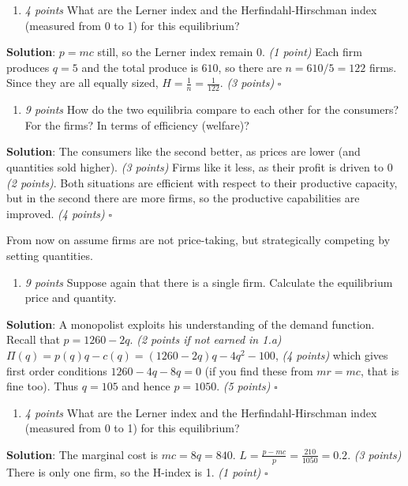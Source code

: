 \documentclass{article}
\begin{document}
\begin{enumerate}[resume*]
\item \textit{4 points }What are the Lerner index and the Herfindahl-Hirschman index (measured from 0 to 1) for this equilibrium?\end{enumerate}
\textbf{Solution}:
$p=mc$ still, so the Lerner index remain 0. \textit{(1 point)} Each firm produces $q=5$ and the total produce is $610$, so there are $n=610/5=122$ firms. Since they are all equally sized, $H=\frac 1n=\frac 1{122}$. \textit{(3 points)} $\square$

\begin{enumerate}[resume*]
  \item \textit{9 points }How do the two equilibria compare to each other for the consumers? For the firms? In terms of efficiency (welfare)?\end{enumerate}
\textbf{Solution}:
The consumers like the second better, as prices are lower (and quantities sold higher). \textit{(3 points)} Firms like it less, as their profit is driven to 0 \textit{(2 points)}. Both situations are efficient with respect to their productive capacity, but in the second there are more firms, so the productive capabilities are improved. \textit{(4 points)} $\square$


From now on assume firms are not price-taking, but strategically competing by setting quantities.

\begin{enumerate}[resume*]
\item \textit{9 points }Suppose again that there is a single firm. Calculate the equilibrium price and quantity.\end{enumerate}
\textbf{Solution}:
A monopolist exploits his understanding of the demand function. Recall that $p=1260-2q$. \textit{(2 points if not earned in 1.a)}
$\Pi(q)=p(q)q-c(q)=(1260-2q)q-4q^{2}-100$, \textit{(4 points)} which gives first order conditions $1260-4q-8q=0$ (if you find these from $mr=mc$, that is fine too). Thus $q=105$ and hence $p=1050$. \textit{(5 points)} $\square$

\begin{enumerate}[resume*]
\item \textit{4 points }What are the Lerner index and the Herfindahl-Hirschman index (measured from 0 to 1) for this equilibrium?\end{enumerate}
\textbf{Solution}:
The marginal cost is $mc=8q=840$. $L=\frac{p-mc}p=\frac{210}{1050}=0.2$. \textit{(3 points)} There is only one firm, so the H-index is 1. \textit{(1 point)} $\square$
\end{document}
